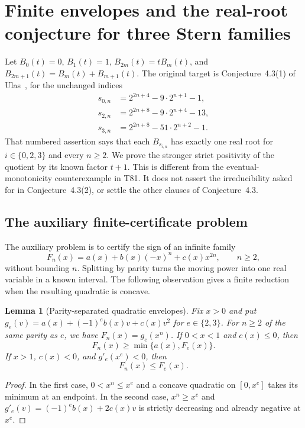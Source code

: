 \documentclass[11pt,a4paper]{article}
\newtheorem{lemma}[theorem]{Lemma}
\theoremstyle{definition}\newtheorem{definition}[theorem]{Definition}
\theoremstyle{remark}\newtheorem{remark}[theorem]{Remark}
\begin{document}
\section{Finite envelopes and the real-root conjecture for three Stern families}
\label{sec:stern-three-families}

Let $B_0(t)=0$, $B_1(t)=1$, $B_{2m}(t)=tB_m(t)$, and
$B_{2m+1}(t)=B_m(t)+B_{m+1}(t)$. The original target is
Conjecture~4.3(1) of Ulas~\cite{Ulas20}, for the unchanged indices
\begin{align*}
 s_{0,n}&=2^{2n+4}-9\cdot2^{n+1}-1,\\
 s_{2,n}&=2^{2n+8}-9\cdot2^{n+4}-13,\\
 s_{3,n}&=2^{2n+8}-51\cdot2^{n+2}-1.
\end{align*}
That numbered assertion says that each $B_{s_{i,n}}$ has exactly one real
root for $i\in\{0,2,3\}$ and every $n\geq2$. We prove the stronger
strict positivity of the quotient by its known factor $t+1$.
This is different from the eventual-monotonicity counterexample in T81.
It does not assert the irreducibility asked for in Conjecture~4.3(2),
or settle the other clauses of Conjecture~4.3.

\subsection{The auxiliary finite-certificate problem}

The auxiliary problem is to certify the sign of an infinite family
\[
 F_n(x)=a(x)+b(x)(-x)^n+c(x)x^{2n},\qquad n\geq2,
\]
without bounding $n$. Splitting by parity turns the moving power into
one real variable in a known interval. The following observation gives a
finite reduction when the resulting quadratic is concave.

\begin{lemma}[Parity-separated quadratic envelopes]\label{lem:stern-envelope}
Fix $x>0$ and put
$g_e(v)=a(x)+(-1)^e b(x)v+c(x)v^2$ for $e\in\{2,3\}$.
For $n\geq2$ of the same parity as $e$, we have $F_n(x)=g_e(x^n)$.
If $0<x<1$ and $c(x)\leq0$, then
\[
 F_n(x)\geq\min\{a(x),F_e(x)\}.
\]
If $x>1$, $c(x)<0$, and $g'_e(x^e)<0$, then
\[
 F_n(x)\leq F_e(x).
\]
\end{lemma}
\begin{proof}
In the first case, $0<x^n\leq x^e$ and a concave quadratic on
$[0,x^e]$ takes its minimum at an endpoint. In the second case,
$x^n\geq x^e$ and $g'_e(v)=(-1)^e b(x)+2c(x)v$ is strictly decreasing
and already negative at $x^e$.
\end{proof}
\end{document}
